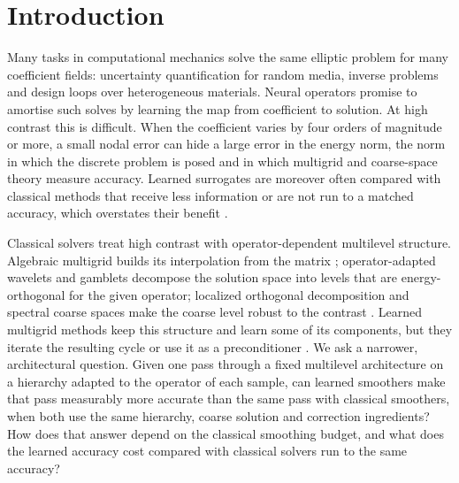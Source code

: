\section{Introduction}\label{sec:intro}
Many tasks in computational mechanics solve the same elliptic problem for many coefficient fields: uncertainty
quantification for random media, inverse problems and design loops over heterogeneous materials. Neural operators
\cite{kovachki2023,li2021fno,tripura2023wno} promise to amortise such solves by learning the map from coefficient to
solution. At high contrast this is difficult. When the coefficient varies by four orders of magnitude or more, a small nodal
error can hide a large error in the energy norm, the norm in which the discrete problem is posed and in which multigrid and
coarse-space theory measure accuracy. Learned surrogates are moreover often compared with classical methods that receive
less information or are not run to a matched accuracy, which overstates their benefit \cite{mcgreivy2024,chatain2025}.

Classical solvers treat high contrast with operator-dependent multilevel structure. Algebraic multigrid builds its
interpolation from the matrix \cite{vanek1996,xu2017acta}; operator-adapted wavelets
\cite{amaratunga2006,sudarshan2006,sudarshan2005thesis,dheedene2005thesis} and gamblets \cite{owhadi2017} decompose the
solution space into levels that are energy-orthogonal for the given operator; localized orthogonal decomposition and
spectral coarse spaces make the coarse level robust to the contrast
\cite{malqvist2014,peterseim2016,hellman2017,galvis2010,spillane2014geneo}. Learned multigrid methods keep this structure
and learn some of its components, but they iterate the resulting cycle or use it as a preconditioner
\cite{greenfeld2019,luz2020,huang2023,wangluo2026,zhanglisaad2026}. We ask a narrower, architectural question. Given one
pass through a fixed multilevel architecture on a hierarchy adapted to the operator of each sample, can learned smoothers
make that pass measurably more accurate than the same pass with classical smoothers, when both use the same hierarchy,
coarse solution and correction ingredients? How does that answer depend on the classical smoothing budget, and what does the
learned accuracy cost compared with classical solvers run to the same accuracy?

